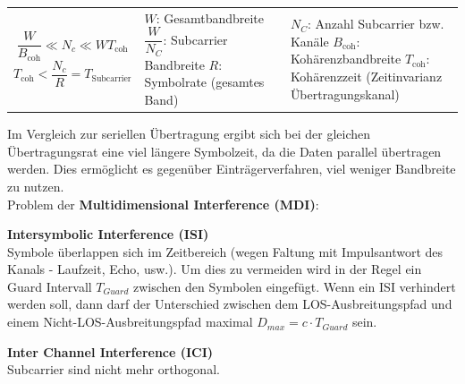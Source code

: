 \begin{tabular}{lll}
\parbox{4cm}{
$$\frac W{B_{\text{coh}}} \ll N_c \ll WT_{\text{coh}} $$ 
$$ T_{\text{coh}} < \dfrac{N_c}{R} = T_{\text{Subcarrier}} $$
       } 
&
\parbox{5cm}{
   $W$: Gesamtbandbreite \\
   $\dfrac{W}{N_C}$: Subcarrier Bandbreite \\
   $R$: Symbolrate (gesamtes Band)
}       
&
\parbox{9cm}{
   $N_C$: Anzahl Subcarrier bzw. Kanäle \\
   $B_{\text{coh}}$: Kohärenzbandbreite \\
   $T_{\text{coh}}$: Kohärenzzeit (Zeitinvarianz Übertragungskanal)
}       
\end{tabular}

Im Vergleich zur seriellen Übertragung ergibt sich bei der gleichen
Übertragungsrat eine viel längere Symbolzeit, da die Daten parallel übertragen werden. Dies
ermöglicht es gegenüber Einträgerverfahren, viel weniger Bandbreite zu nutzen.
\\

Problem der \textbf{Multidimensional Interference (MDI)}:
\begin{liste}
    \item \textbf{Intersymbolic Interference (ISI)} \\
            Symbole überlappen sich im Zeitbereich (wegen Faltung mit Impulsantwort des Kanals - Laufzeit, Echo, usw.). 
			Um dies zu vermeiden wird in der Regel ein Guard Intervall $T_{Guard}$ zwischen den Symbolen eingefügt. 
			Wenn ein ISI verhindert werden soll, dann darf der Unterschied zwischen dem LOS-Ausbreitungspfad und einem 
			Nicht-LOS-Ausbreitungspfad maximal $D_{max} = c\cdot T_{Guard}$ sein.
    \item \textbf{Inter Channel Interference (ICI)} \\
            Subcarrier sind nicht mehr orthogonal. \\
\end{liste}

